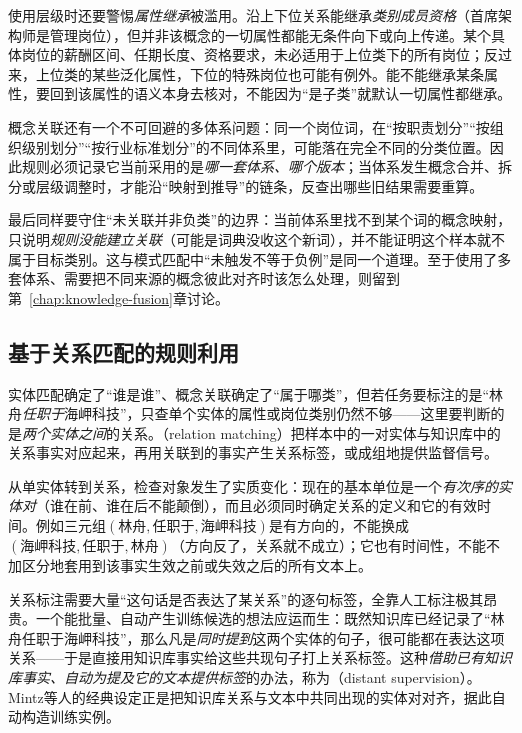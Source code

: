 使用层级时还要警惕\emph{属性继承}被滥用。沿上下位关系能继承\emph{类别成员资格}（首席架构师是管理岗位），但并非该概念的一切属性都能无条件向下或向上传递。某个具体岗位的薪酬区间、任期长度、资格要求，未必适用于上位类下的所有岗位；反过来，上位类的某些泛化属性，下位的特殊岗位也可能有例外。能不能继承某条属性，要回到该属性的语义本身去核对，不能因为“是子类”就默认一切属性都继承。

概念关联还有一个不可回避的多体系问题：同一个岗位词，在“按职责划分”“按组织级别划分”“按行业标准划分”的不同体系里，可能落在完全不同的分类位置。因此规则必须记录它当前采用的是\emph{哪一套体系、哪个版本}；当体系发生概念合并、拆分或层级调整时，才能沿“映射到推导”的链条，反查出哪些旧结果需要重算。

最后同样要守住“未关联并非负类”的边界：当前体系里找不到某个词的概念映射，只说明\emph{规则没能建立关联}（可能是词典没收这个新词），并不能证明这个样本就不属于目标类别。这与模式匹配中“未触发不等于负例”是同一个道理。至于使用了多套体系、需要把不同来源的概念彼此对齐时该怎么处理，则留到第~\ref{chap:knowledge-fusion}章讨论。

\subsection{基于关系匹配的规则利用}
\label{sec:rule-based-knowledge-acquisition-relation-matching}

实体匹配确定了“谁是谁”、概念关联确定了“属于哪类”，但若任务要标注的是“林舟\emph{任职于}海岬科技”，只查单个实体的属性或岗位类别仍然不够——这里要判断的是\emph{两个实体之间}的关系。（relation matching）把样本中的一对实体与知识库中的关系事实对应起来，再用关联到的事实产生关系标签，或成组地提供监督信号。

从单实体转到关系，检查对象发生了实质变化：现在的基本单位是一个\emph{有次序的实体对}（谁在前、谁在后不能颠倒），而且必须同时确定关系的定义和它的有效时间。例如三元组$(\text{林舟},\text{任职于},\text{海岬科技})$是有方向的，不能换成$(\text{海岬科技},\text{任职于},\text{林舟})$（方向反了，关系就不成立）；它也有时间性，不能不加区分地套用到该事实生效之前或失效之后的所有文本上。

关系标注需要大量“这句话是否表达了某关系”的逐句标签，全靠人工标注极其昂贵。一个能批量、自动产生训练候选的想法应运而生：既然知识库已经记录了“林舟任职于海岬科技”，那么凡是\emph{同时提到}这两个实体的句子，很可能都在表达这项关系——于是直接用知识库事实给这些共现句子打上关系标签。这种\emph{借助已有知识库事实、自动为提及它的文本提供标签}的办法，称为（distant supervision）。Mintz等人的经典设定正是把知识库关系与文本中共同出现的实体对对齐，据此自动构造训练实例。


